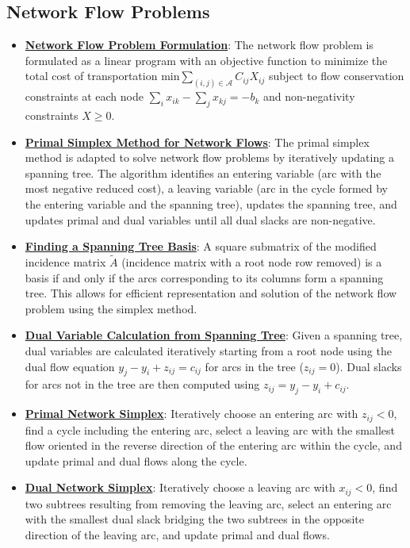 \documentclass{article}%
\begin{document}
%
\subsection{Network Flow Problems}%
\label{subsec:NetworkFlowProblems}%
\begin{itemize}[leftmargin=*]%
\item \href{https://www.math.purdue.edu/~yipn/421/2024-11-05-NetFlows.pdf#page=2}{\textbf{Network Flow Problem Formulation}}: The network flow problem is formulated as a linear program with an objective function to minimize the total cost of transportation $\text{min} \sum_{(i,j) \in \mathcal{A}} C_{ij} X_{ij}$ subject to flow conservation constraints at each node $\sum_{i} x_{ik} - \sum_{j} x_{kj} = -b_k$ and non-negativity constraints $X \ge 0$.%
\item \href{https://www.math.purdue.edu/~yipn/421/2024-11-05-NetFlows.pdf#page=22}{\textbf{Primal Simplex Method for Network Flows}}: The primal simplex method is adapted to solve network flow problems by iteratively updating a spanning tree. The algorithm identifies an entering variable (arc with the most negative reduced cost), a leaving variable (arc in the cycle formed by the entering variable and the spanning tree), updates the spanning tree, and updates primal and dual variables until all dual slacks are non-negative.%
\item \href{https://www.math.purdue.edu/~yipn/421/2024-11-05-NetFlows.pdf#page=15}{\textbf{Finding a Spanning Tree Basis}}: A square submatrix of the modified incidence matrix $\tilde{A}$ (incidence matrix with a root node row removed) is a basis if and only if the arcs corresponding to its columns form a spanning tree. This allows for efficient representation and solution of the network flow problem using the simplex method.%
\item \href{https://www.math.purdue.edu/~yipn/421/2024-11-05-NetFlows.pdf#page=18}{\textbf{Dual Variable Calculation from Spanning Tree}}: Given a spanning tree, dual variables are calculated iteratively starting from a root node using the dual flow equation $y_j - y_i + z_{ij} = c_{ij}$ for arcs in the tree ($z_{ij} = 0$). Dual slacks for arcs not in the tree are then computed using $z_{ij} = y_j - y_i + c_{ij}$.%
\item \href{https://www.math.purdue.edu/~yipn/421/2024-11-07-NetSimplex.pdf#page=5}{\textbf{Primal Network Simplex}}: Iteratively choose an entering arc with $z_{ij} < 0$, find a cycle including the entering arc, select a leaving arc with the smallest flow oriented in the reverse direction of the entering arc within the cycle, and update primal and dual flows along the cycle.%
\item \href{https://www.math.purdue.edu/~yipn/421/2024-11-07-NetSimplex.pdf#page=32}{\textbf{Dual Network Simplex}}: Iteratively choose a leaving arc with $x_{ij} < 0$, find two subtrees resulting from removing the leaving arc, select an entering arc with the smallest dual slack bridging the two subtrees in the opposite direction of the leaving arc, and update primal and dual flows.%
\end{itemize}
\end{document}
